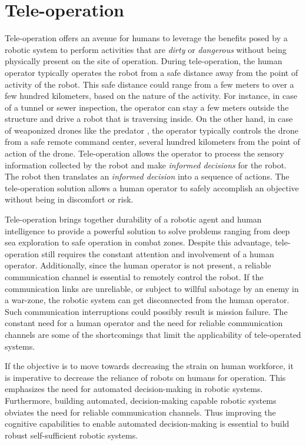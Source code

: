 \section{Tele-operation}

Tele-operation offers an avenue for humans to leverage the benefits posed by a robotic system to perform activities 
that are \emph{dirty} or \emph{dangerous} without being physically present on the site of operation. During tele-operation, the human operator 
typically operates the robot from a safe distance away from the point of activity of the robot. This safe distance could range from a few meters to over a few hundred kilometers, based on the nature of the activity. For instance, in case of a tunnel or sewer inspection, the operator can stay a few meters outside the structure and drive a robot that is traversing inside. On the other hand, in case of weaponized drones like the predator \cite{predator}, the operator typically controls the drone from a safe remote command center, several hundred kilometers from the point of action of the drone. Tele-operation allows the operator to process the sensory information collected by the robot and make \emph{informed decisions} for the robot. The robot then translates an \emph{informed decision} into a sequence of actions. The tele-operation solution allows a human operator to safely accomplish an objective 
without being in discomfort or risk. 

Tele-operation brings together durability of a robotic agent and human intelligence to provide a powerful solution to solve problems ranging from deep sea exploration to safe operation in combat zones. Despite this advantage, tele-operation still requires the constant attention and involvement of a human operator. Additionally, since the human operator is not present, a reliable communication channel is essential to remotely control the robot. If the communication links are unreliable, or subject to willful sabotage by an enemy in a war-zone, the robotic system can get disconnected from the human operator. Such communication interruptions could possibly result is mission failure. The constant need for a human operator and the need for reliable communication channels are some of the shortcomings that limit the applicability of tele-operated systems.

If the objective is to move towards decreasing the strain on human workforce, it is imperative to decrease the reliance of robots on humans for operation. This emphasizes the need for automated decision-making in robotic systems. Furthermore, building automated, decision-making capable robotic systems obviates the need for reliable communication channels. Thus improving the cognitive capabilities to enable automated decision-making is essential to build robust self-sufficient robotic systems.

